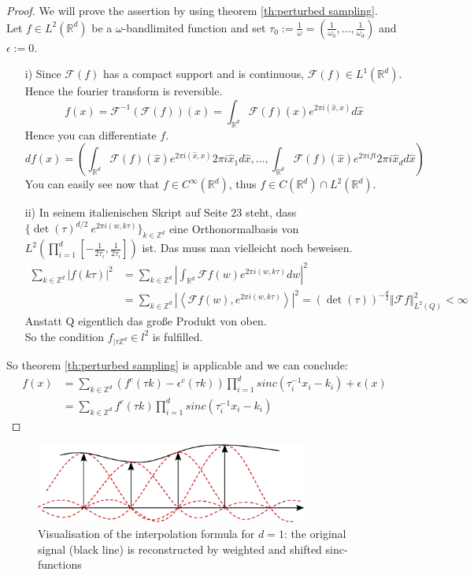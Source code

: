 \documentclass[a4paper, 11pt]{scrreprt}
\newcommand{\RR}{\mathbb{R}}
\newcommand{\ZZ}{\mathbb{Z}}
\newcommand{\FF}{\mathcal{F}}
\begin{document}
\begin{proof}[Proof]
We will prove the assertion by using theorem \ref{th:perturbed sampling}.\\ Let $f \in L^2(\RR^d)$ be a $\omega$-bandlimited function and set $\tau_0 := \frac{1}{\omega} = \left(\frac{1}{\omega_0}, \ldots, \frac{1}{\omega_d}\right)$ and $\epsilon := 0$.
\begin{itemize}
\item[i)] Since \(\FF(f)\) has a compact support and is continuous, \(\FF(f) \in L^1(\RR^d)\). Hence the fourier transform is reversible.
	 \[f(x) = \FF^{-1}(\FF(f))(x) = \int_{\RR^d}\FF(f)(\hat{x}) e^{2 \pi i (\hat{x},x)} d\hat{x}\]
	 Hence you can differentiate $f$.
	 \[df(x) = \left(\int_{\RR^d} \FF(f)(\hat{x}) e^{2 \pi i (\hat{x},x)} 2 \pi i \hat{x}_1 d\hat{x}, \ldots, \int_{\RR^d} \FF(f)(\hat{x}) e^{2 \pi i f t} 2 \pi i \hat{x}_d d\hat{x} \right)\]
	 You can easily see now that \(f \in C^\infty(\RR^d)\), thus $f \in C(\RR^d) \cap L^2(\RR^d)$.
\item[ii)] In seinem italienischen Skript auf Seite 23 steht, dass $\{\det(\tau)^{d/2}\ e^{2 \pi i (w,k \tau)}\}_{k \in \ZZ^d}$ eine Orthonormalbasis von $L^2\left(\prod_{i=1}^d \left[-\frac{1}{2\tau_i}, \frac{1}{2 \tau_i} \right] \right)$ ist. Das muss man vielleicht noch beweisen. 
\begin{align*}
\sum_{k \in \ZZ^d} |f(k \tau)|^2
&= \sum_{k \in \ZZ^d} | \int_{\RR^d} \FF f(w) e^{2 \pi i (w,k \tau)}dw|^2 \\
&= \sum_{k \in \ZZ^d} | \left\langle \FF f(w), e^{2 \pi i (w,k \tau)}\right\rangle |^2
= (\det(\tau))^{-\frac{d}{2}} \Vert \FF f \Vert_{L^2(Q)}^2 < \infty
\end{align*}
Anstatt Q eigentlich das große Produkt von oben. \\
So the condition $f_{|\tau\ZZ^d} \in l^2$ is fulfilled.

\end{itemize}

So theorem \ref{th:perturbed sampling} is applicable and we can conclude:
\begin{align*}
f(x) &= \sum_{k\in\ZZ^d} (f^c(\tau k)-\epsilon^c(\tau k))\prod _{i=1}^d sinc(\tau_i^{-1}x_i-k_i)+\epsilon(x) \\
&= \sum_{k \in \ZZ^d} f^c(\tau k) \prod_{i=1}^d sinc\left(\tau_i^{-1} x_i -k_i\right)  
\end{align*}

\end{proof}
\begin{figure}[htpb]
	\centering
	\includegraphics[width=0.80\textwidth]{Rekonstruktion-Visualisierung.pdf}
	\caption{Visualisation of the interpolation formula for \(d=1\): the original signal (black line) is reconstructed by weighted and shifted sinc-functions}
\end{figure}
\end{document}
